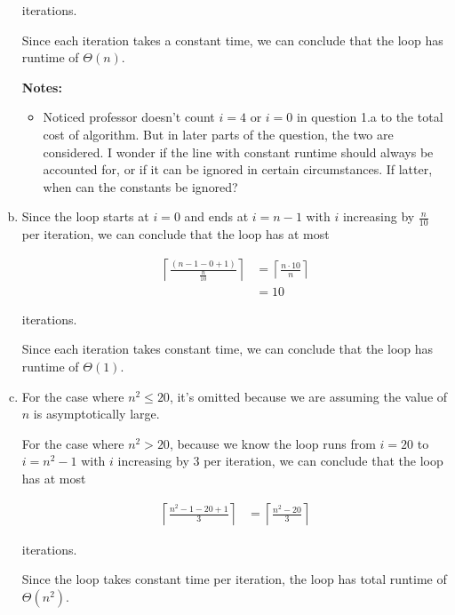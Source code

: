 \documentclass[12pt]{article}
\begin{document}
\begin{enumerate}[a.]
\begin{mdframed}
        iterations.

        \bigskip

        Since each iteration takes a constant time, we can conclude that the loop has
        runtime of \color{red}$\Theta(n)$\color{black}.

    \end{mdframed}

    \bigskip

    \textbf{Notes:}

    \begin{itemize}
        \item Noticed professor doesn't count $i = 4$ or $i = 0$ in question 1.a
        to the total cost of algorithm. But in later parts of the question, the two
        are considered. I wonder if the line with constant runtime
        should always be accounted for, or if it can be ignored in certain circumstances.
        If latter, when can the constants be ignored?

    \end{itemize}

    \item

    Since the loop starts at $i = 0$ and ends at $i = n-1$ with $i$ increasing
    by $\frac{n}{10}$ per iteration, we can conclude that the loop has at most

    \setcounter{equation}{0}
    \begin{align}
        \left\lceil \frac{(n-1-0+1)}{\frac{n}{10}} \right\rceil &= \left\lceil \frac{n \cdot 10}{n} \right\rceil\\
        &= 10
    \end{align}

    iterations.

    \bigskip

    Since each iteration takes constant time, we can conclude that the loop has
    runtime of $\Theta(1)$.

    \item

    For the case where $n^2 \leq 20$, it's omitted because we are assuming the
    value of $n$ is asymptotically large.

    \bigskip

    For the case where $n^2 > 20$, because we know the loop runs from $i = 20$ to
    $i = n^2 - 1$ with $i$ increasing by 3 per iteration, we can conclude that the
    loop has at most

    \setcounter{equation}{0}
    \begin{align}
        \left\lceil \frac{n^2 - 1 - 20 + 1}{3} \right\rceil &= \left\lceil \frac{n^2 - 20}{3} \right\rceil
    \end{align}

    iterations.

    \bigskip

    Since the loop takes constant time per iteration, the loop has total runtime
    of $\Theta(n^2)$.

\end{enumerate}
\end{document}
